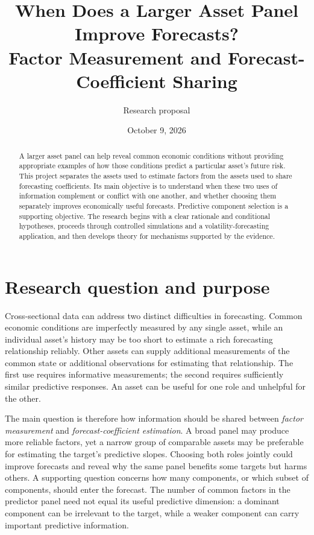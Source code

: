 \documentclass[11pt]{article}
\title{When Does a Larger Asset Panel Improve Forecasts?\\
\large Factor Measurement and Forecast-Coefficient Sharing}
\author{Research proposal}
\date{October 9, 2026}
\begin{document}
\maketitle
\begin{abstract}
A larger asset panel can help reveal common economic conditions without providing appropriate examples of how those conditions predict a particular asset's future risk. This project separates the assets used to estimate factors from the assets used to share forecasting coefficients. Its main objective is to understand when these two uses of information complement or conflict with one another, and whether choosing them separately improves economically useful forecasts. Predictive component selection is a supporting objective. The research begins with a clear rationale and conditional hypotheses, proceeds through controlled simulations and a volatility-forecasting application, and then develops theory for mechanisms supported by the evidence.
\end{abstract}

\section{Research question and purpose}
Cross-sectional data can address two distinct difficulties in forecasting. Common economic conditions are imperfectly measured by any single asset, while an individual asset's history may be too short to estimate a rich forecasting relationship reliably. Other assets can supply additional measurements of the common state or additional observations for estimating that relationship. The first use requires informative measurements; the second requires sufficiently similar predictive responses. An asset can be useful for one role and unhelpful for the other.

The main question is therefore how information should be shared between \emph{factor measurement} and \emph{forecast-coefficient estimation}. A broad panel may produce more reliable factors, yet a narrow group of comparable assets may be preferable for estimating the target's predictive slopes. Choosing both roles jointly could improve forecasts and reveal why the same panel benefits some targets but harms others. A supporting question concerns how many components, or which subset of components, should enter the forecast. The number of common factors in the predictor panel need not equal its useful predictive dimension: a dominant component can be irrelevant to the target, while a weaker component can carry important predictive information.
\end{document}
